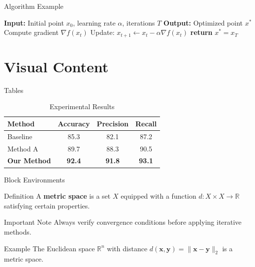 \documentclass[aspectratio=169, dvipsnames]{beamer}
\begin{document}
\begin{frame}{Algorithm Example}
    \begin{algorithm}[H]
        \caption{Gradient Descent}
        \begin{algorithmic}[1]
            \State \textbf{Input:} Initial point $x_0$, learning rate $\alpha$, iterations $T$
            \State \textbf{Output:} Optimized point $x^*$
                \State Compute gradient $\nabla f(x_t)$
                \State Update: $x_{t+1} \gets x_t - \alpha \nabla f(x_t)$
            \EndFor
            \State \textbf{return} $x^* = x_T$
        \end{algorithmic}
    \end{algorithm}
\end{frame}


\section{Visual Content}

\begin{frame}{Tables}
    \begin{table}
        \centering
        \caption{Experimental Results}
        \begin{tabular}{lccc}
            \toprule
            \textbf{Method} & \textbf{Accuracy} & \textbf{Precision} & \textbf{Recall} \\
            \midrule
            Baseline & 85.3 & 82.1 & 87.2 \\
            Method A & 89.7 & 88.3 & 90.5 \\
            \textbf{Our Method} & \textbf{92.4} & \textbf{91.8} & \textbf{93.1} \\
            \bottomrule
        \end{tabular}
    \end{table}
\end{frame}

\begin{frame}{Block Environments}
    \begin{block}{Definition}
        A \textbf{metric space} is a set $X$ equipped with a function $d: X \times X \to \mathbb{R}$ satisfying certain properties.
    \end{block}
    
    \vspace{1em}
    
    \begin{alertblock}{Important Note}
        Always verify convergence conditions before applying iterative methods.
    \end{alertblock}
    
    \vspace{1em}
    
    \begin{exampleblock}{Example}
        The Euclidean space $\mathbb{R}^n$ with distance $d(\mathbf{x}, \mathbf{y}) = \|\mathbf{x} - \mathbf{y}\|_2$ is a metric space.
    \end{exampleblock}
\end{frame}
\end{document}
